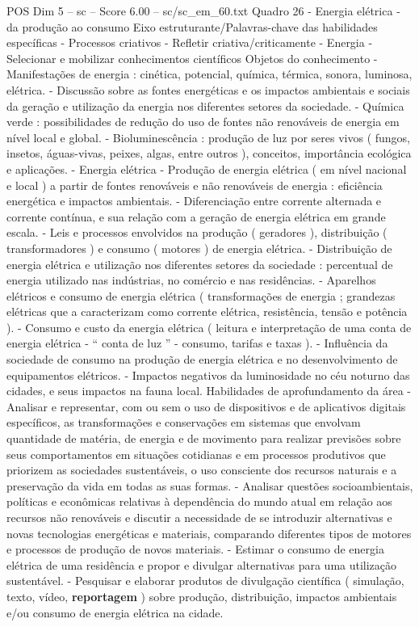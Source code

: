 \begin{textsample}{POS Dim 5 – sc – Score 6.00 – sc/sc\_em\_60.txt}
Quadro 26 - Energia elétrica - da produção ao consumo Eixo estruturante/Palavras-chave das habilidades específicas - Processos criativos - Refletir criativa/criticamente - Energia - Selecionar e mobilizar conhecimentos científicos Objetos do conhecimento - Manifestações de energia : cinética, potencial, química, térmica, sonora, luminosa, elétrica. - Discussão sobre as fontes energéticas e os impactos ambientais e sociais da geração e utilização da energia nos diferentes setores da sociedade. - Química verde : possibilidades de redução do uso de fontes não renováveis de energia em nível local e global. - Bioluminescência : produção de luz por seres vivos ( fungos, insetos, águas-vivas, peixes, algas, entre outros ), conceitos, importância ecológica e aplicações. - Energia elétrica - Produção de energia elétrica ( em nível nacional e local ) a partir de fontes renováveis e não renováveis de energia : eficiência energética e impactos ambientais. - Diferenciação entre corrente alternada e corrente contínua, e sua relação com a geração de energia elétrica em grande escala. - Leis e processos envolvidos na produção ( geradores ), distribuição ( transformadores ) e consumo ( motores ) de energia elétrica. - Distribuição de energia elétrica e utilização nos diferentes setores da sociedade : percentual de energia utilizado nas indústrias, no comércio e nas residências. - Aparelhos elétricos e consumo de energia elétrica ( transformações de energia ; grandezas elétricas que a caracterizam como corrente elétrica, resistência, tensão e potência ). - Consumo e custo da energia elétrica ( leitura e interpretação de uma conta de energia elétrica - “ conta de luz ” - consumo, tarifas e taxas ). - Influência da sociedade de consumo na produção de energia elétrica e no desenvolvimento de equipamentos elétricos. - Impactos negativos da luminosidade no céu noturno das cidades, e seus impactos na fauna local.
Habilidades de aprofundamento da área - Analisar e representar, com ou sem o uso de dispositivos e de aplicativos digitais específicos, as transformações e conservações em sistemas que envolvam quantidade de matéria, de energia e de movimento para realizar previsões sobre seus comportamentos em situações cotidianas e em processos produtivos que priorizem as sociedades sustentáveis, o uso consciente dos recursos naturais e a preservação da vida em todas as suas formas. - Analisar questões socioambientais, políticas e econômicas relativas à dependência do mundo atual em relação aos recursos não renováveis e discutir a necessidade de se introduzir alternativas e novas tecnologias energéticas e materiais, comparando diferentes tipos de motores e processos de produção de novos materiais. - Estimar o consumo de energia elétrica de uma residência e propor e divulgar alternativas para uma utilização sustentável. - Pesquisar e elaborar produtos de divulgação científica ( simulação, texto, vídeo, \textbf{reportagem} ) sobre produção, distribuição, impactos ambientais e/ou consumo de energia elétrica na cidade.

\end{textsample}
